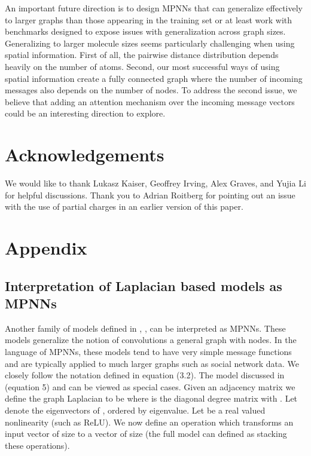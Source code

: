 \documentclass{article}
\begin{document}
An important future direction is to design MPNNs that can generalize effectively to larger graphs than those appearing in the training set or at least work with benchmarks designed to expose issues with generalization across graph sizes. Generalizing to larger molecule sizes seems particularly challenging when using spatial information. First of all, the pairwise distance distribution depends heavily on the number of atoms. Second, our most successful ways of using spatial information create a fully connected graph where the number of incoming messages also depends on the number of nodes. To address the second issue, we believe that adding an attention mechanism over the incoming message vectors could be an interesting direction to explore. 



\section*{Acknowledgements} 

We would like to thank Lukasz Kaiser, Geoffrey Irving, Alex Graves, and Yujia Li for helpful discussions. Thank you to Adrian Roitberg for pointing out an issue with the use of partial charges in an earlier version of this paper.




\section{Appendix}
\subsection{Interpretation of Laplacian based models as MPNNs}
    Another family of models defined in  \citet{defferrard2016convolutional}, \citet{bruna2013spectral}, \citet{kipf2016} can be interpreted as MPNNs. These models generalize the notion of convolutions a general graph  with  nodes. In the language of MPNNs, these models tend to have very simple message functions and are typically applied to much larger graphs such as social network data.  We closely follow the notation defined in \citet{bruna2013spectral} equation (3.2). The model discussed in \citet{defferrard2016convolutional} (equation 5) and \citet{kipf2016} can be viewed as special cases.  Given an adjacency matrix  we define the graph Laplacian to be  where  is the diagonal degree matrix with . Let  denote the eigenvectors of , ordered by eigenvalue. Let  be a real valued nonlinearity (such as ReLU). We now define an operation which transforms an input vector  of size  to a vector  of size  (the full model can defined as stacking these operations). 
    
\end{document}
